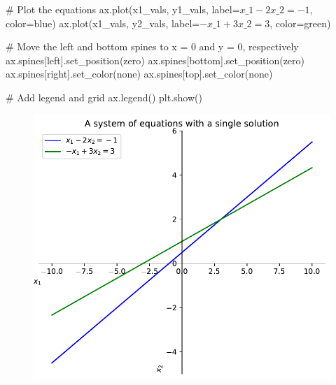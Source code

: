 \documentclass[
  letterpaper,
  DIV=11,
  numbers=noendperiod]{scrreprt}
\newenvironment{Shaded}{\begin{snugshade}}{\end{snugshade}}
\newcommand{\CommentTok}[1]{\textcolor[rgb]{0.37,0.37,0.37}{#1}}
\newcommand{\NormalTok}[1]{\textcolor[rgb]{0.00,0.23,0.31}{#1}}
\newcommand{\OperatorTok}[1]{\textcolor[rgb]{0.37,0.37,0.37}{#1}}
\newcommand{\StringTok}[1]{\textcolor[rgb]{0.13,0.47,0.30}{#1}}
\begin{document}
\begin{Shaded}
\begin{Highlighting}[]
\CommentTok{\# Plot the equations}
\NormalTok{ax.plot(x1\_vals, y1\_vals, label}\OperatorTok{=}\StringTok{\textquotesingle{}$x\_1 {-} 2x\_2 = {-}1$\textquotesingle{}}\NormalTok{, color}\OperatorTok{=}\StringTok{\textquotesingle{}blue\textquotesingle{}}\NormalTok{)}
\NormalTok{ax.plot(x1\_vals, y2\_vals, label}\OperatorTok{=}\StringTok{\textquotesingle{}${-}x\_1 + 3x\_2 = 3$\textquotesingle{}}\NormalTok{, color}\OperatorTok{=}\StringTok{\textquotesingle{}green\textquotesingle{}}\NormalTok{)}

\CommentTok{\# Move the left and bottom spines to x = 0 and y = 0, respectively}
\NormalTok{ax.spines[}\StringTok{\textquotesingle{}left\textquotesingle{}}\NormalTok{].set\_position(}\StringTok{\textquotesingle{}zero\textquotesingle{}}\NormalTok{)}
\NormalTok{ax.spines[}\StringTok{\textquotesingle{}bottom\textquotesingle{}}\NormalTok{].set\_position(}\StringTok{\textquotesingle{}zero\textquotesingle{}}\NormalTok{)}
\NormalTok{ax.spines[}\StringTok{\textquotesingle{}right\textquotesingle{}}\NormalTok{].set\_color(}\StringTok{\textquotesingle{}none\textquotesingle{}}\NormalTok{)}
\NormalTok{ax.spines[}\StringTok{\textquotesingle{}top\textquotesingle{}}\NormalTok{].set\_color(}\StringTok{\textquotesingle{}none\textquotesingle{}}\NormalTok{)}

\CommentTok{\# Add legend and grid}
\NormalTok{ax.legend()}
\NormalTok{plt.show()}
\end{Highlighting}
\end{Shaded}

\begin{figure}[H]

{\centering \includegraphics{p1_files/figure-pdf/cell-3-output-1.pdf}

}

\end{figure}
\end{document}
